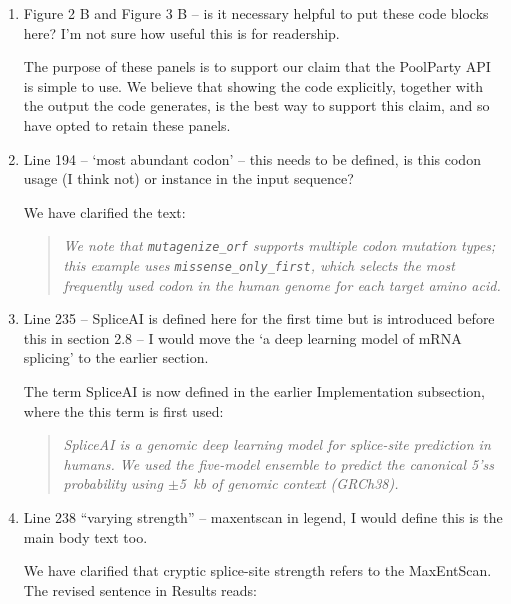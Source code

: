 \documentclass[11pt]{article}
\newenvironment{response}{\par\color{responseblue}}{\par}
\newenvironment{msquote}
  {\begin{quote}\color{responseblue}\itshape\noindent\ignorespaces}
  {\end{quote}}
\begin{document}
\begin{enumerate}
\item Figure 2 B and Figure 3 B -- is it necessary helpful to put these code
blocks here? I'm not sure how useful this is for readership.

\begin{response}
The purpose of these panels is to support our claim that the PoolParty API is simple to use. We believe that showing the code explicitly, together with the output the code generates, is the best way to support this claim, and so have opted to retain these panels. 
\end{response}

\item Line 194 -- `most abundant codon' -- this needs to be defined, is this
codon usage (I think not) or instance in the input sequence?

\begin{response}
We have clarified the text:
\end{response}

\begin{msquote}
We note that \texttt{mutagenize\_orf} supports multiple codon mutation types; this example uses \texttt{missense\_only\_first}, which selects the most frequently used codon in the human genome for each target amino acid.
\end{msquote}

\item Line 235 -- SpliceAI is defined here for the first time but is introduced
before this in section 2.8 -- I would move the `a deep learning model of mRNA
splicing' to the earlier section.

\begin{response}
The term SpliceAI is now defined in the earlier Implementation subsection, where the
this term is first used:
\end{response}

\begin{msquote}
SpliceAI \citep{Jaganathan2019ps} is a genomic deep learning model for splice-site prediction in humans. We used the five-model ensemble to predict the canonical 5'ss probability using $\pm$5~kb of genomic context (GRCh38).
\end{msquote}

\item Line 238 ``varying strength'' -- maxentscan in legend, I would define this
is the main body text too.

\begin{response}
We have clarified that cryptic splice-site strength refers to the MaxEntScan. The revised sentence in Results reads:
\end{response}


\end{enumerate}
\end{document}
